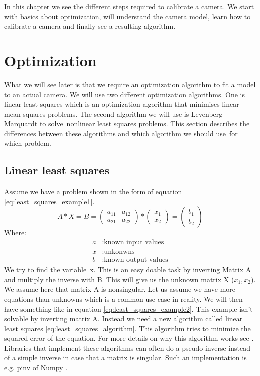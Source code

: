 \documentclass[11pt,a4paper,titlepage,oneside]{report}
\begin{document}
In this chapter we see the different steps required to calibrate a camera. We start with basics about optimization, will understand the camera model, learn how to calibrate a camera and finally see a resulting algorithm.

\section{Optimization}
What we will see later is that we require an optimization algorithm to fit a model to an actual camera. We will use two different optimization algorithms. One is linear least squares which is an optimization algorithm that minimises linear mean squares problems. The second algorithm we will use is Levenberg-Marquardt to solve nonlinear least squares problems. This section describes the differences between these algorithms and which algorithm we should use for which problem.

\subsection{Linear least squares}
Assume we have a problem shown in the form of equation \ref{eq:least_squares_example1}.
\begin{equation}\label{eq:least_squares_example1}
  A*X=B=\begin{pmatrix}
    a_{11} & a_{12} \\
    a_{21} & a_{22}
  \end{pmatrix}*
  \begin{pmatrix}
    x_1 \\
    x_2
  \end{pmatrix}=
  \begin{pmatrix}
    b_1 \\
    b_2
  \end{pmatrix}
\end{equation}
Where:
\begin{align*}
  a		  &: \text{known input values}\\
  x	  	&: \text{unkonwns}\\
  b		  &: \text{known output values}
\end{align*}
We try to find the variable x. This is an easy doable task by inverting Matrix A and multiply the inverse with B. This will give us the unknown matrix X ($x_1,x_2$). We assume here that matrix A is nonsingular. Let us assume we have more equations than unknowns which is a common use case in reality. We will then have something like in equation \ref{eq:least_squares_example2}. This example isn't solvable by inverting matrix A. Instead we need a new algorithm called linear least squares \ref{eq:least_squares_algorithm}. This algorithm tries to minimize the squared error of the equation. For more details on why this algorithm works see \cite{Hayes}. Libraries that implement these algorithms can often do a pseudo-inverse instead of a simple inverse in case that a matrix is singular. Such an implementation is e.g. pinv of Numpy \cite{pinv}.
\end{document}

